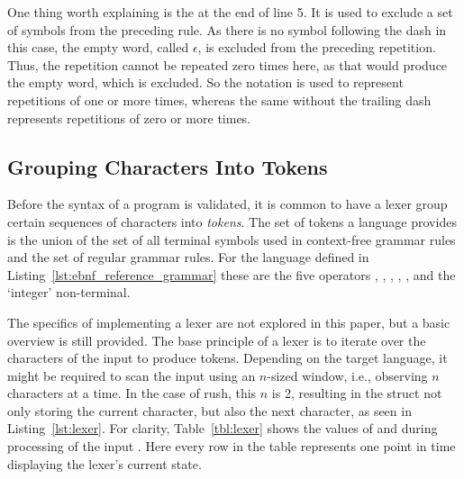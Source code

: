 One thing worth explaining is the \qVerb{-} at the end of line 5.
It is used to exclude a set of symbols from the preceding rule.
As there is no symbol following the dash in this case, the empty word, called $\epsilon$, is excluded from the preceding repetition.
Thus, the repetition cannot be repeated zero times here, as that would produce the empty word, which is excluded.
So the notation  is used to represent repetitions of one or more times, whereas the same without the trailing dash represents repetitions of zero or more times.

\subsection{Grouping Characters Into Tokens}

Before the syntax of a program is validated, it is common to have a lexer group certain sequences of characters into \emph{tokens}.
The set of tokens a language provides is the union of the set of all terminal symbols used in context-free grammar rules and the set of regular grammar rules.
For the language defined in Listing~\ref{lst:ebnf_reference_grammar} these are the five operators \qVerb{+}, \qVerb{-}, \qVerb{*}, \qVerb{/}, \qVerb{**}, and the `integer' non-terminal.


The specifics of implementing a lexer are not explored in this paper, but a basic overview is still provided.
The base principle of a lexer is to iterate over the characters of the input to produce tokens.
Depending on the target language, it might be required to scan the input using an $n$-sized window, i.e., observing $n$ characters at a time.
In the case of rush, this $n$ is 2, resulting in the  struct not only storing the current character, but also the next character, as seen in Listing~\ref{lst:lexer}.
For clarity, Table~\ref{tbl:lexer} shows the values of  and  during processing of the input .
Here every row in the table represents one point in time displaying the lexer's current state.

